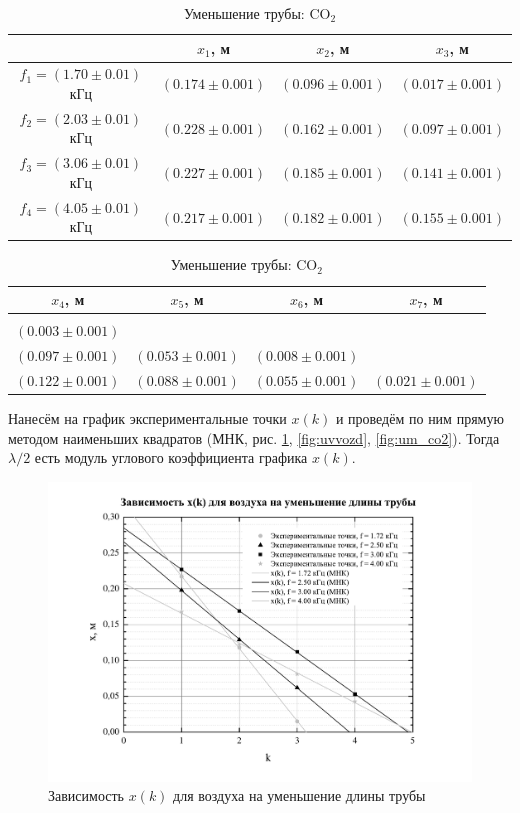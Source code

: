 \documentclass[a4paper,12pt]{article}
\begin{document}
\begin{table}[h!]
	\centering
	\caption{Уменьшение трубы: CO$_2$}
	\label{tab:uv_co2}
	\begin{tabular}{|c|c|c|c|}
		\hline 
		& $x_1$, м & $x_2$, м & $x_3$, м\\ 
		\hline 
		\rule[0ex]{0pt}{2.5ex} $f_1=(1.70\pm0.01)$ кГц & $(0.174\pm0.001)$ & $(0.096\pm0.001)$ & $(0.017\pm0.001)$ \\ 
		\hline 
		\rule[0ex]{0pt}{2.5ex} $f_2=(2.03\pm0.01)$ кГц & $(0.228\pm0.001)$ & $(0.162\pm0.001)$ & $(0.097\pm0.001)$\\ 
		\hline 
		\rule[0ex]{0pt}{2.5ex} $f_3=(3.06\pm0.01)$ кГц & $(0.227\pm0.001)$ & $(0.185\pm0.001)$ & $(0.141\pm0.001)$\\ 
		\hline 
		\rule[0ex]{0pt}{2.5ex} $f_4=(4.05\pm0.01)$ кГц & $(0.217\pm0.001)$ & $(0.182\pm0.001)$ & $(0.155\pm0.001)$\\ 
		\hline
	\end{tabular}
	\begin{tabular}{|c|c|c|c|}
		\hline 
		$x_4$, м & $x_5$, м & $x_6$, м & $x_7$, м \\ 
		\hline 
		  &  &  &  \\ 
		\hline 
		\rule[0ex]{0pt}{2.5ex} $(0.003\pm0.001)$ &  &  &  \\ 
		\hline 
		\rule[0ex]{0pt}{2.5ex} $(0.097\pm0.001)$ & $(0.053\pm0.001)$ & $(0.008\pm0.001)$ &  \\ 
		\hline 
		\rule[0ex]{0pt}{2.5ex} $(0.122\pm0.001)$ & $(0.088\pm0.001)$ & $(0.055\pm0.001)$ & $(0.021\pm0.001)$ \\ 
		\hline 
	\end{tabular} 
\end{table}

Нанесём на график экспериментальные точки $x(k)$ и проведём по ним прямую методом наименьших квадратов (МНК, рис. \ref{fig:umvozd}, \ref{fig:uvvozd}, \ref{fig:um_co2}). Тогда $\lambda/2$ есть модуль углового коэффициента графика $x(k)$.
\begin{figure}
	\centering
	\includegraphics[width=0.8\linewidth]{um_vozd}
	\caption{Зависимость $x(k)$ для воздуха на уменьшение длины трубы}
	\label{fig:umvozd}
\end{figure}
\end{document}
